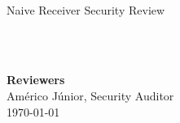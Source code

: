 \begin{titlepage}
  \vbox{}
  \vbox{}

  \begin{center}


    \noindent\makebox[\linewidth]{\rule{.7\paperwidth}{.6pt}}\\[0.7cm]

    { \huge \bfseries

      Naive Receiver Security Review
    }\\[0.25cm]
    
    \noindent\makebox[\linewidth]{\rule{.7\paperwidth}{.6pt}}\\[0.7cm]

    
    \vfill


    
    \large
    {\bfseries Reviewers}\\
    
    Américo Júnior, Security Auditor \\

    {\large \today}

  \end{center}

\end{titlepage}